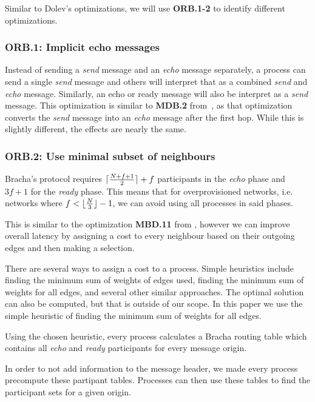 Similar to Dolev's optimizations, we will use \textbf{ORB.1-2} to identify different optimizations.

\subsubsection{ORB.1: Implicit echo messages}
Instead of sending a \textit{send} message and an \textit{echo} message separately, a process can send a single \textit{send} message and others will interpret that as a combined \textit{send} and \textit{echo} message. Similarly, an echo or ready message will also be interpret as a \textit{send} message. This optimization is similar to \textbf{MDB.2} from~\cite{bonomi2021practical}, as that optimization converts the \textit{send} message into an \textit{echo} message after the first hop. While this is slightly different, the effects are nearly the same.


\subsubsection{ORB.2: Use minimal subset of neighbours}
Bracha's protocol requires $\lceil\frac{N+f+1}{2}\rceil + f$ participants in the \textit{echo} phase and $3f+1$ for the \textit{ready} phase. This means that for overprovisioned networks, i.e. networks where $f < \lfloor\frac{N}{3}\rfloor - 1$, we can avoid using all processes in said phases.

This is similar to the optimization \textbf{MBD.11} from \cite{bonomi2021practical}, however we can improve overall latency by assigning a cost to every neighbour based on their outgoing edges and then making a selection. 

There are several ways to assign a cost to a process. Simple heuristics include finding the minimum sum of weights of edges used, finding the minimum sum of weights for all edges, and several other similar approaches. The optimal solution can also be computed, but that is outside of our scope. In this paper we use the simple heuristic of finding the minimum sum of weights for all edges.

Using the chosen heuristic, every process calculates a Bracha routing table which contains all \textit{echo} and \textit{ready} participants for every message origin.

In order to not add information to the message header, we made every process precompute these partipant tables. Processes can then use these tables to find the participant sets for a given origin.


